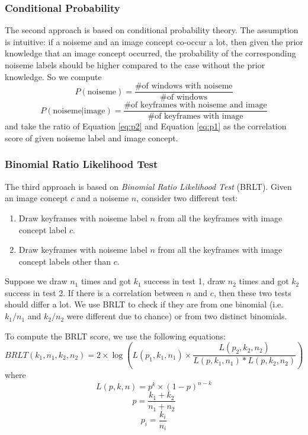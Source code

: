 \documentclass[conference, 11pt, onecolumn]{IEEEtran}
\begin{document}
\subsubsection{Conditional Probability}
The second approach is based on conditional probability theory. The assumption is intuitive: if a noiseme and an image concept co-occur a lot, then given the prior knowledge that an image concept occurred, the probability of the corresponding noiseme labels should be higher compared to the case without the prior knowledge. So we compute
\begin{equation}
\label{eq:p1}
P(\mbox{noiseme}) = \frac{\mbox{\# of windows with noiseme}}{\mbox{\# of windows}}
\end{equation}
\begin{equation}
\label{eq:p2}
P(\mbox{noiseme} | \mbox{image}) = \frac{\mbox{\# of keyframes with noiseme and image}}{\mbox{\# of keyframes with image}}
\end{equation}
and take the ratio of Equation \ref{eq:p2} and Equation \ref{eq:p1} as the correlation score of given noiseme label and image concept.

\subsubsection{Binomial Ratio Likelihood Test}
The third approach is based on \emph{Binomial Ratio Likelihood Test} (BRLT). Given an image concept $c$ and a noiseme $n$, consider two different test:

\begin{enumerate}
\item Draw keyframes with noiseme label $n$ from all the keyframes with image concept label $c$.
\item Draw keyframes with noiseme label $n$ from all the keyframes with image concept labels other than $c$.
\end{enumerate}

Suppose we draw $n_1$ times and got $k_1$ success in test 1, draw $n_2$ times and got $k_2$ success in test 2. If there is a correlation between $n$ and $c$, then these two tests should differ a lot. We use BRLT to check if they are from one binomial (i.e. $k_1/n_1$ and $k_2/n_2$ were different due to chance) or from two distinct binomials.

To compute the BRLT score, we use the following equations:
\begin{equation}
\label{eq:brlt1}
BRLT(k_1, n_1, k_2, n_2) = 2 \times \log \left( L(p_1, k_1, n_1) \times  \frac{L(p_2, k_2, n_2)}{L(p, k_1, n_1) * L(p, k_2, n_2)} \right)
\end{equation}
where
\begin{equation}
\label{eq:brlt2}
L(p, k, n) = p^k \times (1 - p)^{n - k}
\end{equation}
\begin{equation}
\label{eq:brlt3}
p = \frac{k_1 + k_2}{n_1 + n_2}
\end{equation}
\begin{equation}
\label{eq:brlt4}
p_i = \frac{k_i}{n_i}
\end{equation}
\end{document}
